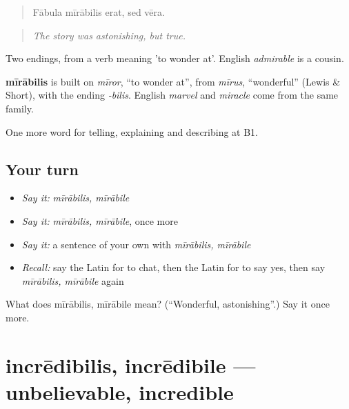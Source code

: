 \begin{quote}
Fābula mīrābilis erat, sed vēra.
\end{quote}

\begin{quote}
\emph{The story was astonishing, but true.}
\end{quote}

Two endings, from a verb meaning 'to wonder at'. English \emph{admirable} is a cousin.

\begin{cousinweb}
\textbf{mīrābilis} is built on \emph{mīror}, \textquotedblleft{}to wonder at\textquotedblright{}, from \emph{mīrus}, \textquotedblleft{}wonderful\textquotedblright{} (Lewis \& Short), with the ending \emph{-bilis}. English \emph{marvel} and \emph{miracle} come from the same family.
\end{cousinweb}

\begin{grammarlens}[title={What you've built}]
One more word for telling, explaining and describing at B1.
\end{grammarlens}

\subsection*{Your turn}
\begin{itemize}
\raggedright
  \item \emph{Say it:} \emph{mīrābilis, mīrābile}
  \item \emph{Say it:} \emph{mīrābilis, mīrābile}, once more
  \item \emph{Say it:} a sentence of your own with \emph{mīrābilis, mīrābile}
  \item \emph{Recall:} say the Latin for to chat, then the Latin for to say yes, then say \emph{mīrābilis, mīrābile} again
\end{itemize}

\begin{tcolorbox}[breakable,colback=teal!4,colframe=teal!35!black,title={Before you move on}]
What does mīrābilis, mīrābile mean? (\textquotedblleft{}Wonderful, astonishing\textquotedblright{}.) Say it once more.
\end{tcolorbox}
\section[incrēdibilis, incrēdibile]{incrēdibilis, incrēdibile — unbelievable, incredible}


